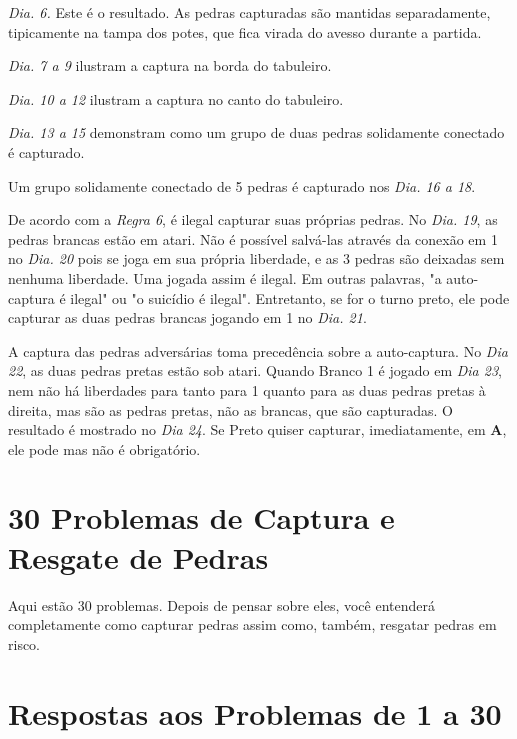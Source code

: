 \emph{Dia. 6.} Este é o resultado. As pedras capturadas são mantidas separadamente, tipicamente na tampa dos potes, que fica virada do avesso durante a partida.

\emph{Dia. 7 a 9} ilustram a captura na borda do tabuleiro.

\emph{Dia. 10 a 12} ilustram a captura  no canto do tabuleiro.

\emph{Dia. 13 a 15} demonstram  como um grupo de duas pedras solidamente conectado é capturado.

Um grupo solidamente conectado de 5 pedras é capturado nos \emph{Dia. 16 a 18}.

De acordo com a \emph{Regra 6}, é ilegal capturar suas próprias pedras. No \emph{Dia. 19}, as pedras brancas estão em atari. Não é possível salvá-las através da conexão em 1 no \emph{Dia. 20} pois se joga em sua própria liberdade, e as 3 pedras são deixadas sem nenhuma liberdade. Uma jogada assim é ilegal. Em outras palavras, "a auto-captura é ilegal" ou "o suicídio é ilegal". Entretanto, se for o turno preto, ele pode capturar as duas pedras brancas jogando em 1 no \emph{Dia. 21}.

A captura das pedras adversárias toma precedência sobre a auto-captura. No \emph{Dia 22}, as duas pedras pretas estão sob atari. Quando Branco 1 é jogado em \emph{Dia 23}, nem não há liberdades para tanto para 1 quanto para as duas pedras pretas à direita, mas são as pedras pretas, não as brancas, que são capturadas. O resultado é mostrado no \emph{Dia 24}. Se Preto quiser capturar, imediatamente, em \textbf{A}, ele pode mas não é obrigatório.

\section{30 Problemas de Captura e Resgate de Pedras}

Aqui estão 30 problemas. Depois de pensar sobre eles, você entenderá completamente como capturar pedras assim como, também, resgatar pedras em risco.

\section{Respostas aos Problemas de 1 a 30}

